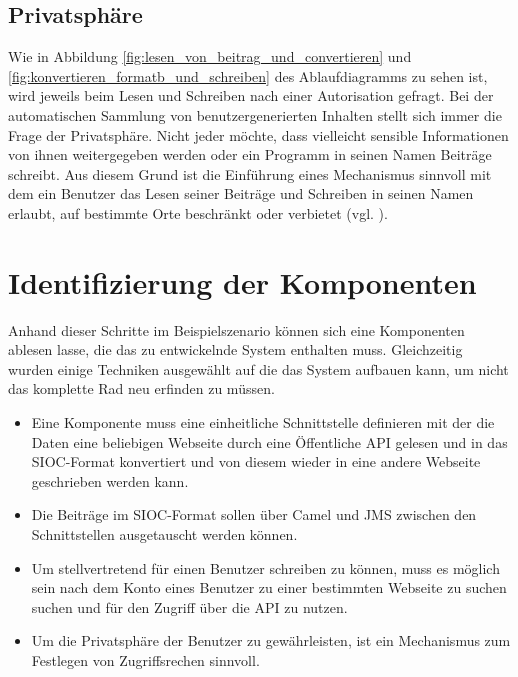 
\subsection{Privatsphäre} %
\label{sub:privatsphäre}

Wie in Abbildung \ref{fig:lesen_von_beitrag_und_convertieren} und \ref{fig:konvertieren_formatb_und_schreiben} des Ablaufdiagramms zu sehen ist, wird jeweils beim Lesen und Schreiben nach einer Autorisation gefragt. Bei der automatischen Sammlung von benutzergenerierten Inhalten stellt sich immer die Frage der Privatsphäre. Nicht jeder möchte, dass vielleicht sensible Informationen von ihnen weitergegeben werden oder ein Programm in seinen Namen Beiträge schreibt. Aus diesem Grund ist die Einführung eines Mechanismus sinnvoll mit dem ein Benutzer das Lesen seiner Beiträge und Schreiben in seinen Namen erlaubt, auf bestimmte Orte beschränkt oder verbietet (vgl. \cite[S.\,7]{Bojars2011}). 


\section{Identifizierung der Komponenten} %
\label{sec:identifizierung_der_komponenten}

Anhand dieser Schritte im Beispielszenario können sich eine Komponenten ablesen lasse, die das zu entwickelnde System enthalten muss. Gleichzeitig wurden einige Techniken ausgewählt auf die das System aufbauen kann, um nicht das komplette Rad neu erfinden zu müssen. 

\begin{itemize} 
    \item Eine Komponente muss eine einheitliche Schnittstelle definieren mit der die Daten eine beliebigen Webseite durch eine Öffentliche API gelesen und in das SIOC-Format konvertiert und von diesem wieder in eine andere Webseite geschrieben werden kann. 

    \item Die Beiträge im SIOC-Format sollen über Camel und JMS zwischen den Schnittstellen ausgetauscht werden können.

    \item Um stellvertretend für einen Benutzer schreiben zu können, muss es möglich sein nach dem Konto eines Benutzer zu einer bestimmten Webseite zu suchen suchen und für den Zugriff über die API zu nutzen.

    \item Um die Privatsphäre der Benutzer zu gewährleisten, ist ein Mechanismus zum Festlegen von Zugriffsrechen sinnvoll.
\end{itemize}   


